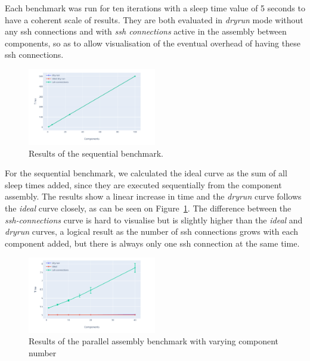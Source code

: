 Each benchmark was run for ten iterations with a sleep time value of 5 seconds to have a coherent scale of results. They are both evaluated in \emph{dryrun} mode without any ssh connections and with \emph{ssh connections} active in the assembly between components, so as to allow visualisation of the eventual overhead of having these ssh connections.

\begin{figure}[h]
  \begin{center} 
    \includegraphics[width=0.5\textwidth]{./images/evaluations_sequential.pdf}
    \caption{Results of the sequential benchmark.}
    \label{fig:seqres}
  \end{center}
\end{figure}

For the sequential benchmark, we calculated the ideal curve as the sum of all sleep times added, since they are executed sequentially from the component assembly. The results show a linear increase in time and the \emph{dryrun} curve follows the \emph{ideal} curve closely, as can be seen on Figure~\ref{fig:seqres}. The difference between the \emph{ssh-connections} curve is hard to visualise but is slightly higher than the \emph{ideal} and \emph{dryrun} curves, a logical result as the number of ssh connections grows with each component added, but there is always only one ssh connection at the same time.

\begin{figure}[h]
  \begin{center} 
    \includegraphics[width=0.5\textwidth]{./images/evaluations_par_component.pdf}
    \caption{Results of the parallel assembly benchmark with varying component number}
    \label{fig:parcompres}
  \end{center}
\end{figure}

